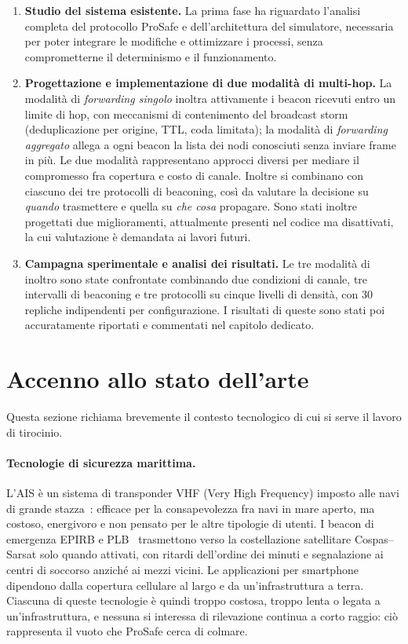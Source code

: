\begin{enumerate}[leftmargin=1.4em]
  \item \textbf{Studio del sistema esistente.} La prima fase ha riguardato
  l'analisi completa del protocollo ProSafe e dell'architettura del simulatore, 
  necessaria per poter integrare le modifiche e ottimizzare i processi, 
  senza comprometterne il determinismo e il funzionamento.
  \item \textbf{Progettazione e implementazione di due modalit\`a di multi-hop.} La modalit\`a di
  \emph{forwarding singolo} inoltra attivamente i beacon ricevuti entro un
  limite di hop, con meccanismi di contenimento del broadcast
  storm~\cite{broadcaststorm} (deduplicazione per origine, TTL, coda limitata); la modalit\`a di
  \emph{forwarding aggregato} allega a ogni beacon la lista dei nodi
  conosciuti senza inviare frame in pi\`u. Le due modalit\`a rappresentano
  approcci diversi per mediare il compromesso fra copertura e costo di canale. 
  Inoltre si combinano con ciascuno dei tre protocolli di beaconing, cos\`i da valutare la
  decisione su \emph{quando} trasmettere e quella su \emph{che cosa}
  propagare. Sono stati inoltre progettati due miglioramenti, attualmente 
  presenti nel codice ma disattivati, la cui valutazione \`e demandata ai lavori futuri.
  \item \textbf{Campagna sperimentale e analisi dei risultati.} Le tre
  modalit\`a di inoltro sono state confrontate combinando due condizioni di
  canale, tre intervalli di beaconing e tre protocolli su cinque livelli di
  densit\`a, con 30 repliche indipendenti per configurazione. I risultati di queste
  sono stati poi accuratamente riportati e commentati nel capitolo dedicato.
\end{enumerate}

\section{Accenno allo stato dell'arte}
\label{sec:intro-sota}
Questa sezione richiama brevemente il contesto tecnologico di cui si serve 
il lavoro di tirocinio.

\paragraph{Tecnologie di sicurezza marittima.}
L'AIS \`e un sistema di transponder VHF (Very High Frequency) imposto alle navi di grande
stazza~\cite{imo-ais}: efficace per la consapevolezza fra navi in mare aperto,
ma costoso, energivoro e non pensato per le altre tipologie di utenti. I beacon di
emergenza EPIRB e PLB~\cite{noaa-beacons} trasmettono verso la costellazione
satellitare Cospas--Sarsat solo quando attivati, con ritardi dell'ordine dei
minuti e segnalazione ai centri di soccorso anzich\'e ai mezzi vicini. Le
applicazioni per smartphone dipendono dalla copertura cellulare al largo e da
un'infrastruttura a terra. Ciascuna di queste tecnologie \`e quindi troppo
costosa, troppo lenta o legata a un'infrastruttura, e nessuna si interessa di
rilevazione continua a corto raggio: ci\`o rappresenta il vuoto che ProSafe
cerca di colmare.

